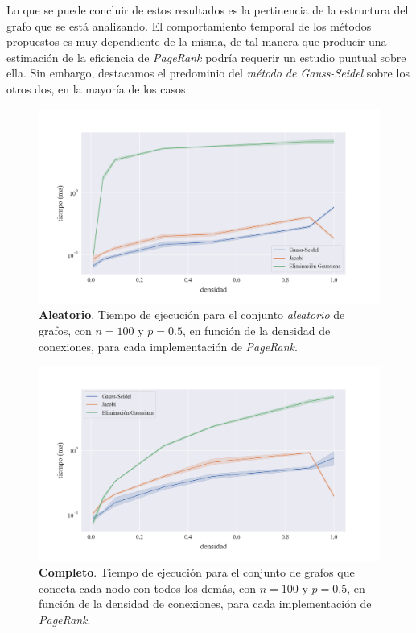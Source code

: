 \vspace{1em}
Lo que se puede concluir de estos resultados es la pertinencia de la estructura del grafo que se está analizando.
El comportamiento temporal de los métodos propuestos es muy dependiente de la misma, de tal manera que
producir una estimación de la eficiencia de \textit{PageRank} podría requerir un estudio puntual sobre ella.
Sin embargo, destacamos el predominio del \textit{método de Gauss-Seidel} sobre los otros dos, en la mayoría de los casos.

\begin{figure}[!htbp]
    \centering
    \includegraphics[width=.9\textwidth]{files/src/.media/densidad_aleatorio.png}
    \caption{\textbf{Aleatorio}. Tiempo de ejecución para el conjunto \textit{aleatorio} de grafos, con $n = 100$ y $p = 0.5$, en función de la densidad de conexiones, para cada implementación de \textit{PageRank}.}
    \label{densidad_aleatorio}
\end{figure}

\vspace{1em}
\begin{figure}[!htbp]
    \centering
    \includegraphics[width=.9\textwidth]{files/src/.media/densidad_todo_con_todo.png}
    \caption{\textbf{Completo}. Tiempo de ejecución para el conjunto de grafos que conecta cada nodo con todos los demás, con $n = 100$ y $p = 0.5$, en función de la densidad de conexiones, para cada implementación de \textit{PageRank}.}
    \label{densidad_todo_con_todo}
\end{figure}

